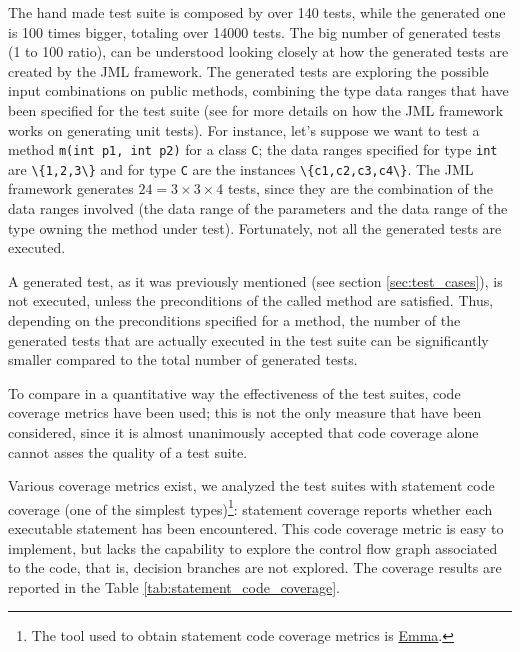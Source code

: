 \documentclass{article} \usepackage{times}
\newcommand{\myhref}[2]{\ifpdf\href{#1}{#2}\else\htmladdnormallinkfoot{#2}{#1}\fi}
\newcommand{\lil}[1]{\texttt{\lstinline|#1|}}
\begin{document}
The hand made test suite is composed by over 140 tests, while the
generated one is 100 times bigger, totaling over 14000 tests.  The big
number of generated tests (1 to 100 ratio), can be understood looking
closely at how the generated tests are created by the JML
framework. The generated tests are exploring the possible input
combinations on public methods, combining the type data ranges that
have been specified for the test suite (see \cite{Cheon-Leavens02} for
more details on how the JML framework works on generating unit
tests). For instance, let's suppose we want to test a method
\lil{m(int p1, int p2)} for a class \lil{C}; the data ranges specified
for type \lil{int} are \lil{\{1,2,3\}} and for type \lil{C} are the
instances \lil{\{c1,c2,c3,c4\}}. The JML framework generates $24 = 3
\times 3 \times 4$ tests, since they are the combination of the data
ranges involved (the data range of the parameters and the data range
of the type owning the method under test). Fortunately, not all the
generated tests are executed.

A generated test, as it was previously mentioned (see section
\ref{sec:test_cases}), is not executed, unless the preconditions of
the called method are satisfied. Thus, depending on the preconditions
specified for a method, the number of the generated tests that are
actually executed in the test suite can be significantly smaller 
compared to the total number of generated tests.

To compare in a quantitative way the effectiveness of the test suites,
code coverage metrics have been used; this is not the only measure
that have been considered, since it is almost unanimously accepted
that code coverage alone cannot asses the quality of a test
suite\cite{Marick1999,Chockler2006}.

Various coverage metrics exist, we analyzed the test suites with
statement code coverage (one of the simplest types)\footnote{The tool
  used to obtain statement code coverage metrics is
  \myhref{http://emma.sourceforge.net/}{Emma}.}: statement coverage
reports whether each executable statement has been encountered. This
code coverage metric is easy to implement, but lacks the capability to
explore the control flow graph associated to the code, that is,
decision branches are not explored. The coverage results are reported
in the Table \ref{tab:statement_code_coverage}.
\end{document}
